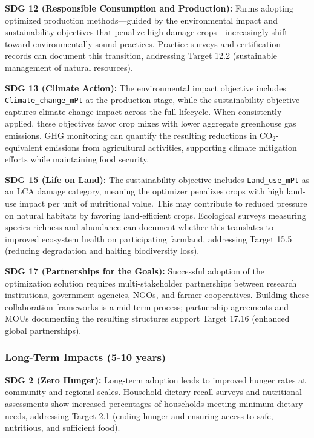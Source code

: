 \documentclass{oqireport}
\begin{document}
\textbf{SDG 12 (Responsible Consumption and Production):} Farms adopting optimized production methods---guided by the environmental impact and sustainability objectives that penalize high-damage crops---increasingly shift toward environmentally sound practices. Practice surveys and certification records can document this transition, addressing Target 12.2 (sustainable management of natural resources).

\textbf{SDG 13 (Climate Action):} The environmental impact objective includes \texttt{Climate\_change\_mPt} at the production stage, while the sustainability objective captures climate change impact across the full lifecycle. When consistently applied, these objectives favor crop mixes with lower aggregate greenhouse gas emissions. GHG monitoring can quantify the resulting reductions in CO$_2$-equivalent emissions from agricultural activities, supporting climate mitigation efforts while maintaining food security.

\textbf{SDG 15 (Life on Land):} The sustainability objective includes \texttt{Land\_use\_mPt} as an LCA damage category, meaning the optimizer penalizes crops with high land-use impact per unit of nutritional value. This may contribute to reduced pressure on natural habitats by favoring land-efficient crops. Ecological surveys measuring species richness and abundance can document whether this translates to improved ecosystem health on participating farmland, addressing Target 15.5 (reducing degradation and halting biodiversity loss).

\textbf{SDG 17 (Partnerships for the Goals):} Successful adoption of the optimization solution requires multi-stakeholder partnerships between research institutions, government agencies, NGOs, and farmer cooperatives. Building these collaboration frameworks is a mid-term process; partnership agreements and MOUs documenting the resulting structures support Target 17.16 (enhanced global partnerships).

\subsubsection{Long-Term Impacts (5-10 years)}

\textbf{SDG 2 (Zero Hunger):} Long-term adoption leads to improved hunger rates at community and regional scales. Household dietary recall surveys and nutritional assessments show increased percentages of households meeting minimum dietary needs, addressing Target 2.1 (ending hunger and ensuring access to safe, nutritious, and sufficient food).
\end{document}
